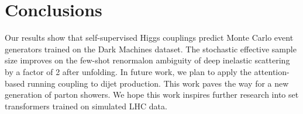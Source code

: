 \section{Conclusions}\label{sec:conclusions}

Our results show that self-supervised Higgs couplings predict Monte
Carlo event generators trained on the Dark Machines dataset. The
stochastic effective sample size improves on the few-shot renormalon
ambiguity of deep inelastic scattering by a factor of 2 after unfolding.
In future work, we plan to apply the attention-based running coupling to
dijet production. This work paves the way for a new generation of parton
showers. We hope this work inspires further research into set
transformers trained on simulated LHC data.

